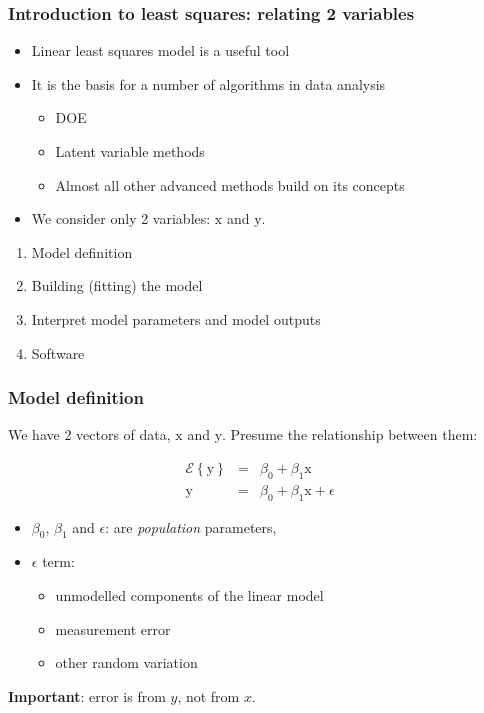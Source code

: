 \begin{frame}\frametitle{Introduction to least squares: relating 2 variables}
	\begin{itemize}
		\item	Linear least squares model is a useful tool
		\item	It is the basis for a number of algorithms in data analysis
		\begin{itemize}
			\item	DOE
			\item	Latent variable methods
			\item	Almost all other advanced methods build on its concepts
		\end{itemize}
	\end{itemize}
	\begin{itemize}
		\item	We consider only 2 variables: $\mathrm{x}$ and $\mathrm{y}$.
	\end{itemize}
	\begin{enumerate}
		\item	Model definition
		\item	Building (fitting) the model
		\item	Interpret model parameters and model outputs
		\item	Software
	\end{enumerate}
\end{frame}

\begin{frame}\frametitle{Model definition}

	We have 2 vectors of data, $\mathrm{x}$ and $\mathrm{y}$. Presume the relationship between them:

	$$
	\begin{array}{rcl}
		\mathcal{E}\left\{\mathrm{y}\right\} &=& \beta_0 + \beta_1 \mathrm{x} \\
		\mathrm{y} &=& \beta_0 + \beta_1 \mathrm{x} + \epsilon
	\end{array}
	$$
	\begin{itemize}
		\item	$\beta_0$, $\beta_1$ and $\epsilon$: are \emph{population} parameters,
		\item	$\epsilon$ term:
		\begin{itemize}
			\item	unmodelled components of the linear model
			\item	measurement error
			\item	other random variation
		\end{itemize}
	\end{itemize}

	\textbf{Important}: error is from $y$, not from $x$.
\end{frame}

